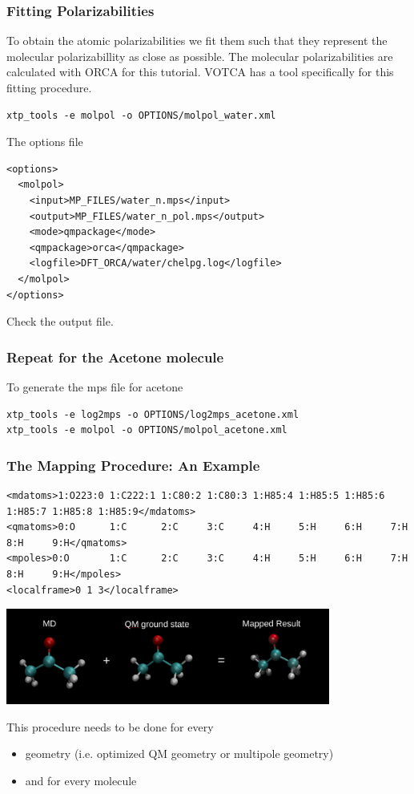 \documentclass[t,aspectratio=169, 8pt]{beamer}
\begin{document}
\begin{frame}[fragile]
  \frametitle{Fitting Polarizabilities}
  To obtain the atomic polarizabilities we fit them such that they represent the
  molecular polarizabillity as close as possible. The molecular polarizabilities
  are calculated with ORCA for this tutorial. VOTCA has a tool specifically for
  this fitting procedure.
  \begin{verbatim}
xtp_tools -e molpol -o OPTIONS/molpol_water.xml
  \end{verbatim}
  The options file
  \begin{verbatim}
<options>
  <molpol>
    <input>MP_FILES/water_n.mps</input>
    <output>MP_FILES/water_n_pol.mps</output>
    <mode>qmpackage</mode>
    <qmpackage>orca</qmpackage>
    <logfile>DFT_ORCA/water/chelpg.log</logfile>
  </molpol>
</options>
  \end{verbatim}
  Check the output file.
\end{frame}

\begin{frame}[fragile]
  \frametitle{Repeat for the Acetone molecule}
  To generate the mps file for acetone
  \begin{verbatim}
xtp_tools -e log2mps -o OPTIONS/log2mps_acetone.xml
xtp_tools -e molpol -o OPTIONS/molpol_acetone.xml
  \end{verbatim}

\end{frame}


\begin{frame}[fragile]
  \frametitle{The Mapping Procedure: An Example}
  \begin{verbatim}
<mdatoms>1:O223:0 1:C222:1 1:C80:2 1:C80:3 1:H85:4 1:H85:5 1:H85:6 1:H85:7 1:H85:8 1:H85:9</mdatoms>
<qmatoms>0:O      1:C      2:C     3:C     4:H     5:H     6:H     7:H     8:H     9:H</qmatoms>
<mpoles>0:O       1:C      2:C     3:C     4:H     5:H     6:H     7:H     8:H     9:H</mpoles>
<localframe>0 1 3</localframe>
  \end{verbatim}

  \begin{center}
    \includegraphics[width=0.8\textwidth]{images/mdAndqm/mapping}
  \end{center}

  \small This procedure needs to be done for every
  \begin{itemize}
    \item geometry (i.e. optimized QM geometry or multipole geometry)
    \item and for every molecule
  \end{itemize}
\end{frame}
\end{document}
